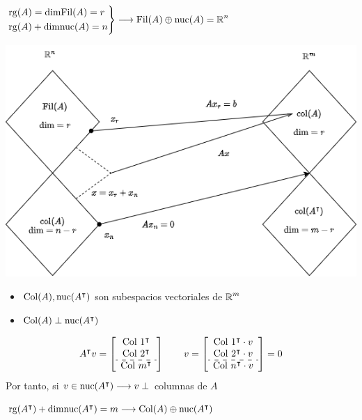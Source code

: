 $\begin{rcases}
	\operatorname{\mathrm{rg}}(A)=\operatorname{\mathrm{dimFil}}(A)=r\\
	\operatorname{\mathrm{rg}}(A)+\operatorname{\mathrm{dimnuc}}(A)=n
\end{rcases}\longrightarrow\operatorname{\mathrm{Fil}}(A)\oplus\operatorname{\mathrm{nuc}}(A)=\operatorname{\mathbb{R}}^n$

\begin{center}
	\includegraphics[width=\textwidth]{"Temas/Tema 4/resumen 4.drawio.png"}
\end{center}

\begin{itemize}
	\item $\operatorname{\mathrm{Col}}(A),\operatorname{\mathrm{nuc}}(A^\intercal)$ son subespacios vectoriales de $\operatorname{\mathbb{R}}^m$
	\item $\operatorname{\mathrm{Col}}(A)\perp\operatorname{\mathrm{nuc}}(A^\intercal)$
\end{itemize}
\[ A^\intercal v=\left[\begin{array}{c}
	\text{Col }1^\intercal\\
	\text{Col }2^\intercal\\ \hdashline
	\text{Col }m^\intercal
\end{array}\right]\qquad v=\left[\begin{array}{c}
\text{Col }1^\intercal\cdot v\\
\text{Col }2^\intercal\cdot v\\ \hdashline
\text{Col }n^\intercal \cdot v
\end{array}\right]=0 \]
Por tanto, si $v\in\operatorname{\mathrm{nuc}}(A^\intercal)\longrightarrow v\perp$ columnas de $A$

$\operatorname{\mathrm{rg}}(A^\intercal)+\operatorname{\mathrm{dimnuc}}(A^\intercal)=m\longrightarrow\operatorname{\mathrm{Col}}(A)\oplus\operatorname{\mathrm{nuc}}(A^\intercal)$




